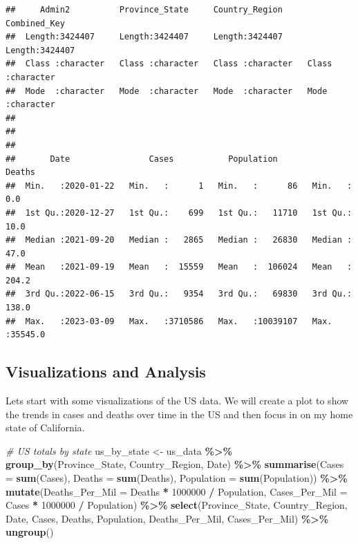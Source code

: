\documentclass[
]{article}
\newenvironment{Shaded}{\begin{snugshade}}{\end{snugshade}}
\newcommand{\AttributeTok}[1]{\textcolor[rgb]{0.13,0.29,0.53}{#1}}
\newcommand{\CommentTok}[1]{\textcolor[rgb]{0.56,0.35,0.01}{\textit{#1}}}
\newcommand{\DecValTok}[1]{\textcolor[rgb]{0.00,0.00,0.81}{#1}}
\newcommand{\FunctionTok}[1]{\textcolor[rgb]{0.13,0.29,0.53}{\textbf{#1}}}
\newcommand{\NormalTok}[1]{#1}
\newcommand{\OtherTok}[1]{\textcolor[rgb]{0.56,0.35,0.01}{#1}}
\newcommand{\SpecialCharTok}[1]{\textcolor[rgb]{0.81,0.36,0.00}{\textbf{#1}}}
\begin{document}
\begin{verbatim}
##     Admin2          Province_State     Country_Region     Combined_Key      
##  Length:3424407     Length:3424407     Length:3424407     Length:3424407    
##  Class :character   Class :character   Class :character   Class :character  
##  Mode  :character   Mode  :character   Mode  :character   Mode  :character  
##                                                                             
##                                                                             
##                                                                             
##       Date                Cases           Population           Deaths       
##  Min.   :2020-01-22   Min.   :      1   Min.   :      86   Min.   :    0.0  
##  1st Qu.:2020-12-27   1st Qu.:    699   1st Qu.:   11710   1st Qu.:   10.0  
##  Median :2021-09-20   Median :   2865   Median :   26830   Median :   47.0  
##  Mean   :2021-09-19   Mean   :  15559   Mean   :  106024   Mean   :  204.2  
##  3rd Qu.:2022-06-15   3rd Qu.:   9354   3rd Qu.:   69830   3rd Qu.:  138.0  
##  Max.   :2023-03-09   Max.   :3710586   Max.   :10039107   Max.   :35545.0
\end{verbatim}

\subsection{Visualizations and
Analysis}\label{visualizations-and-analysis}

Lets start with some visualizations of the US data. We will create a
plot to show the trends in cases and deaths over time in the US and then
focus in on my home state of California.

\begin{Shaded}
\begin{Highlighting}[]
\CommentTok{\# US totals by state}
\NormalTok{us\_by\_state }\OtherTok{\textless{}{-}}\NormalTok{ us\_data }\SpecialCharTok{\%\textgreater{}\%}
  \FunctionTok{group\_by}\NormalTok{(Province\_State, Country\_Region, Date) }\SpecialCharTok{\%\textgreater{}\%}
  \FunctionTok{summarise}\NormalTok{(}\AttributeTok{Cases =} \FunctionTok{sum}\NormalTok{(Cases), }\AttributeTok{Deaths =} \FunctionTok{sum}\NormalTok{(Deaths), }\AttributeTok{Population =} \FunctionTok{sum}\NormalTok{(Population)) }\SpecialCharTok{\%\textgreater{}\%}
  \FunctionTok{mutate}\NormalTok{(}\AttributeTok{Deaths\_Per\_Mil =}\NormalTok{ Deaths }\SpecialCharTok{*} \DecValTok{1000000} \SpecialCharTok{/}\NormalTok{ Population,}
         \AttributeTok{Cases\_Per\_Mil =}\NormalTok{ Cases }\SpecialCharTok{*} \DecValTok{1000000} \SpecialCharTok{/}\NormalTok{ Population) }\SpecialCharTok{\%\textgreater{}\%}
  \FunctionTok{select}\NormalTok{(Province\_State, Country\_Region, Date, Cases, Deaths, Population, Deaths\_Per\_Mil, Cases\_Per\_Mil) }\SpecialCharTok{\%\textgreater{}\%}
  \FunctionTok{ungroup}\NormalTok{()}
\end{Highlighting}
\end{Shaded}
\end{document}
